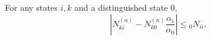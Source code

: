 For any states $i, k$ and a distinguished state $0$,
$$\left| N_{ki}^{(n)} - N_{k0}^{(n)} \frac{\alpha_i}{\alpha_0} \right| \leq {}_0 N_{ii}.$$
